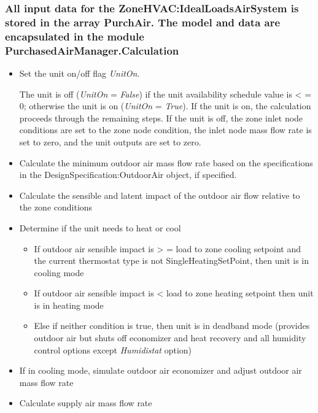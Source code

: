 \subsubsection{All input data for the ZoneHVAC:IdealLoadsAirSystem is stored in the array PurchAir. The model and data are encapsulated in the module PurchasedAirManager.Calculation}\label{all-input-data-for-the-zonehvacidealloadsairsystem-is-stored-in-the-array-purchair.-the-model-and-data-are-encapsulated-in-the-module-purchasedairmanager.calculation}

\begin{itemize}
  \item Set the unit on/off flag \emph{UnitOn}.

    The unit is off (\emph{UnitOn} = \emph{False}) if the unit availability schedule value is \textless{} = 0; otherwise the unit is on (\emph{UnitOn} = \emph{True}). If the unit is on, the calculation proceeds through the remaining steps. If the unit is off, the zone inlet node conditions are set to the zone node condition, the inlet node mass flow rate is set to zero, and the unit outputs are set to zero.

  \item Calculate the minimum outdoor air mass flow rate based on the specifications in the DesignSpecification:OutdoorAir object, if specified.
  \item Calculate the sensible and latent impact of the outdoor air flow relative to the zone conditions
  \item Determine if the unit needs to heat or cool 
    \begin{itemize}
      \item If outdoor air sensible impact is \textgreater{} = load to zone cooling setpoint and the current thermostat type is not SingleHeatingSetPoint, then unit is in cooling mode
      \item If outdoor air sensible impact is \textless{} load to zone heating setpoint then unit is in heating mode
      \item Else if neither condition is true, then unit is in deadband mode (provides outdoor air but shuts off economizer and heat recovery and all humidity control options except \emph{Humidistat} option) 
    \end{itemize}
  \item If in cooling mode, simulate outdoor air economizer and adjust outdoor air mass flow rate
  \item Calculate supply air mass flow rate 


\end{itemize}
